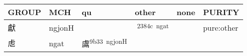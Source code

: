 \documentclass[14pt,a4paper]{scrartcl}
\begin{document}
\begin{longtable}[c]{@{}llllll@{}}
\toprule
\begin{minipage}[b]{0.14\columnwidth}\raggedright\strut
GROUP
\strut\end{minipage} &
\begin{minipage}[b]{0.14\columnwidth}\raggedright\strut
MCH
\strut\end{minipage} &
\begin{minipage}[b]{0.14\columnwidth}\raggedright\strut
qu
\strut\end{minipage} &
\begin{minipage}[b]{0.14\columnwidth}\raggedright\strut
other
\strut\end{minipage} &
\begin{minipage}[b]{0.14\columnwidth}\raggedright\strut
none
\strut\end{minipage} &
\begin{minipage}[b]{0.14\columnwidth}\raggedright\strut
PURITY
\strut\end{minipage}\tabularnewline
\midrule
\endhead
\begin{minipage}[t]{0.14\columnwidth}\raggedright\strut
獻
\strut\end{minipage} &
\begin{minipage}[t]{0.14\columnwidth}\raggedright\strut
ngjonH
\strut\end{minipage} &
\begin{minipage}[t]{0.14\columnwidth}\raggedright\strut
\strut\end{minipage} &
\begin{minipage}[t]{0.14\columnwidth}\raggedright\strut
𣡌\textsuperscript{2384c~ngat}
\strut\end{minipage} &
\begin{minipage}[t]{0.14\columnwidth}\raggedright\strut
\strut\end{minipage} &
\begin{minipage}[t]{0.14\columnwidth}\raggedright\strut
pure:other
\strut\end{minipage}\tabularnewline
\begin{minipage}[t]{0.14\columnwidth}\raggedright\strut
䖈
\strut\end{minipage} &
\begin{minipage}[t]{0.14\columnwidth}\raggedright\strut
ngat
\strut\end{minipage} &
\begin{minipage}[t]{0.14\columnwidth}\raggedright\strut
鬳\textsuperscript{9b33~ngjonH}
\strut\end{minipage} &

\end{longtable}
\end{document}
